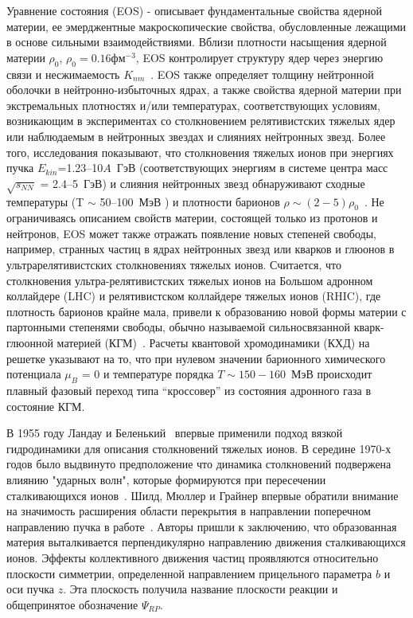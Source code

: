 {\actuality} Уравнение состояния (EOS) - описывает фундаментальные свойства ядерной материи, ее эмерджентные макроскопические свойства, обусловленные лежащими в основе сильными взаимодействиями.  
Вблизи плотности насыщения ядерной материи $\rho_{0}$, $\rho_{0}=0.16 фм^{-3}$,  EOS контролирует структуру ядер через энергию связи и несжимаемость $K_{nm}$~\cite{Danielewicz:2002pu}.
EOS также определяет толщину нейтронной оболочки в нейтронно-избыточных ядрах, а также свойства ядерной материи при экстремальных плотностях и/или температурах, соответствующих условиям, возникающим в экспериментах со столкновением релятивистских тяжелых ядер или наблюдаемым в нейтронных звездах  и слияниях нейтронных звезд. 
Более того, исследования показывают, что столкновения тяжелых ионов при энергиях пучка  $E_{kin}$=1.23--10$A$~ГэВ (соответствующих энергиям в системе центра масс $\sqrt{s_{NN}}$ = 2.4--5~ГэВ)  и слияния нейтронных звезд обнаруживают сходные температуры (T $\sim$  50--100~МэВ ) и плотности барионов $\rho \sim (2-5)\rho_{0}$~\cite{Bzdak:2019pkr,Xu:2022mqn}.
Не ограничиваясь описанием свойств материи, состоящей только из протонов и нейтронов, EOS может также отражать появление новых степеней свободы, например, странных частиц в ядрах нейтронных звезд или кварков и глюонов в ультрарелятивистских столкновениях тяжелых ионов. 
Считается, что столкновения ультра-релятивистских тяжелых ионов на Большом адронном коллайдере (LHC) и релятивистском коллайдере тяжелых ионов (RHIC), где  плотность барионов крайне мала, привели к образованию новой формы материи с партонными степенями свободы, обычно называемой сильносвязанной кварк-глюонной материей (КГМ)~\cite{Esumi:2022uas}.
Расчеты квантовой хромодинамики  (КХД) на решетке указывают на то, что при нулевом значении барионного химического потенциала $\mu_{B}$ = 0 и температуре порядка $T \sim  150-160$~МэВ происходит плавный  фазовый переход типа ``кроссовер'' из состояния адронного газа в состояние КГМ. 

В 1955 году Ландау и Беленький~\cite{Belenkij:1955pgn} впервые применили подход вязкой гидродинамики для описания столкновений тяжелых ионов. 
В середине 1970-х годов было выдвинуто предположение что динамика столкновений подвержена влиянию "ударных волн", которые формируются при пересечении сталкивающихся ионов~\cite{Chapline:1973kkq}.
Шилд, Мюллер и Грайнер впервые обратили внимание на значимость расширения области перекрытия в направлении поперечном направлению пучка в работе~\cite{Scheid:1974zz}.
Авторы пришли к заключению, что образованная материя выталкивается перпендикулярно направлению движения сталкивающихся ионов. 
Эффекты коллективного движения частиц проявляются относительно плоскости симметрии, определенной направлением прицельного параметра $b$ и оси пучка $z$.
Эта плоскость получила название плоскости реакции и общепринятое обозначение $\Psi_{RP}$.

